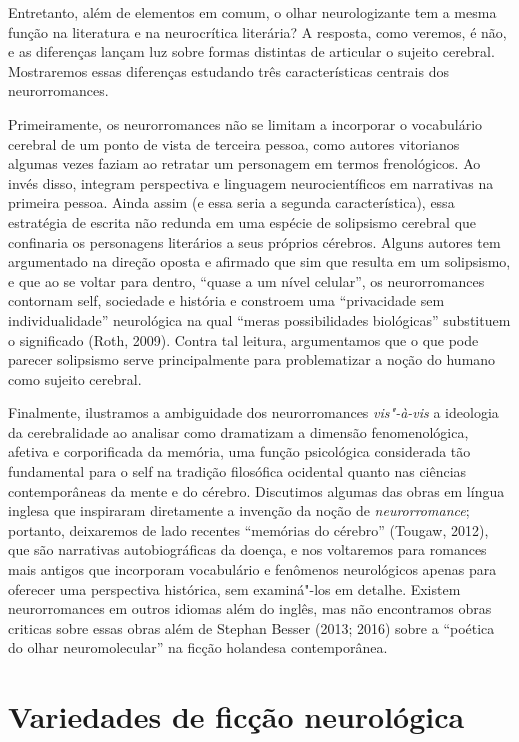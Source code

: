 Entretanto, além de elementos em comum, o olhar neurologizante tem a
mesma função na literatura e na neurocrítica literária? A resposta, como
veremos, é não, e as diferenças lançam luz sobre formas distintas de
articular o sujeito cerebral. Mostraremos essas diferenças estudando
três características centrais dos neurorromances.

Primeiramente, os neurorromances não se limitam a incorporar o
vocabulário cerebral de um ponto de vista de terceira pessoa, como
autores vitorianos algumas vezes faziam ao retratar um personagem em
termos frenológicos. Ao invés disso, integram perspectiva e linguagem
neurocientíficos em narrativas na primeira pessoa. Ainda assim (e essa
seria a segunda característica), essa estratégia de escrita não redunda
em uma espécie de solipsismo cerebral que confinaria os personagens
literários a seus próprios cérebros. Alguns autores tem argumentado na
direção oposta e afirmado que sim que resulta em um solipsismo, e que ao
se voltar para dentro, ``quase a um nível celular'', os neurorromances
contornam self, sociedade e história e constroem uma ``privacidade sem
individualidade'' neurológica na qual ``meras possibilidades
biológicas'' substituem o significado (Roth, 2009). Contra tal leitura,
argumentamos que o que pode parecer solipsismo serve principalmente para
problematizar a noção do humano como sujeito cerebral.

Finalmente, ilustramos a ambiguidade dos neurorromances \emph{vis"-à-vis}
a ideologia da cerebralidade ao analisar como dramatizam a dimensão
fenomenológica, afetiva e corporificada da memória, uma função
psicológica considerada tão fundamental para o self na tradição
filosófica ocidental quanto nas ciências contemporâneas da mente e do
cérebro. Discutimos algumas das obras em língua inglesa que inspiraram
diretamente a invenção da noção de \emph{neurorromance}; portanto,
deixaremos de lado recentes ``memórias do cérebro'' (Tougaw, 2012), que
são narrativas autobiográficas da doença, e nos voltaremos para romances
mais antigos que incorporam vocabulário e fenômenos neurológicos apenas
para oferecer uma perspectiva histórica, sem examiná"-los em detalhe.
Existem neurorromances em outros idiomas além do inglês, mas não
encontramos obras criticas sobre essas obras além de Stephan Besser
(2013; 2016) sobre a ``poética do olhar neuromolecular'' na ficção
holandesa contemporânea.

\chapter{Variedades de ficção neurológica}


